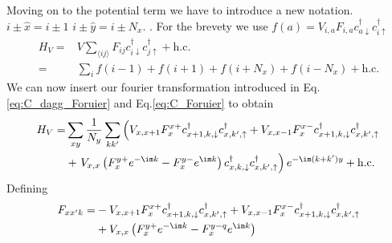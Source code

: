 \documentclass[../main.tex]{subfile}
\begin{document}
Moving on to the potential term we have to introduce a new notation. $i\pm\hat{x} = i\pm 1$  $i\pm\hat{y} = i\pm N_x$. .
For the brevety we use $f(a) = V_{i,a}F_{i,a} c^{\dagger}_{a\downarrow} c^{\dagger}_{i\uparrow}$
\begin{align*}
    H_V =& V \sum_{\langle ij\rangle} F_{ij} c^{\dagger}_{i\downarrow} c^{\dagger}_{j\uparrow} + \text{h.c.} \\
    =& \sum_{i} f(i-1) + f(i+1) + f(i+N_x) + f(i-N_x) + \text{h.c.}
\end{align*}
We can now insert our fourier transformation introduced in Eq.\ref{eq:C_dagg_Foruier} and Eq.\ref{eq:C_Foruier} to obtain
\begin{align*}
    H_V =& \sum_{xy} \frac{1}{N_y} \sum_{kk'} \left( V_{x,x+1} F_{x}^{x+} c^{\dagger}_{x+1,k,\downarrow}c^{\dagger}_{x,k',\uparrow} + V_{x,x-1} F_{x}^{x-} c^{\dagger}_{x+1,k,\downarrow} c^{\dagger}_{x,k',\uparrow} \right.\\
        &+ \left.V_{x,x}\left( F_{x}^{y+} e^{-\im k}  - F_{x}^{y-} e^{\im k}\right) c^{\dagger}_{x,k,\downarrow} c^{\dagger}_{x,k',\uparrow} \right) e^{-\im(k + k')y} + \text{h.c.}\\
\end{align*}
Defining 
\begin{equation*}
    \begin{aligned}
    F_{xx'k} =& - V_{x,x+1} F_{x}^{x+} c^{\dagger}_{x+1,k,\downarrow}c^{\dagger}_{x,k',\uparrow} + V_{x,x-1} F_{x}^{x-} c^{\dagger}_{x+1,k,\downarrow} c^{\dagger}_{x,k',\uparrow} \\
        &+ V_{x,x}\left( F_{x}^{y+} e^{-\im k}  - F_{x}^{y-q} e^{\im k}\right)
    \end{aligned}
\end{equation*} 
\end{document}
